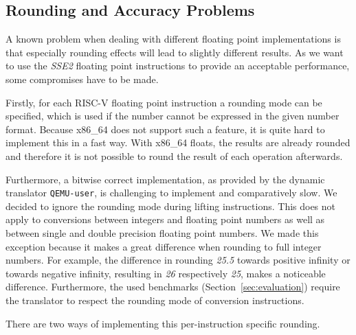 \documentclass[course=eragp]{aspdoc}
\begin{document}
\subsection{Rounding and Accuracy Problems}

A known problem when dealing with different floating point implementations is that especially
rounding effects will lead to slightly different results. As we want to use the \textit{SSE2} floating point
instructions to provide an acceptable performance, some compromises have to be made.

\par

Firstly, for each RISC-V floating point instruction a rounding mode can be specified, which is used
if the number cannot be expressed in the given number format. Because x86\_64 does not support such a
feature, it is quite hard to implement this in a fast way. With x86\_64 floats, the results are already rounded
and therefore it is not possible to round the result of each operation afterwards.

\par

Furthermore, a bitwise correct implementation, as provided by the dynamic translator
\texttt{QEMU-user}, is
challenging to implement and comparatively slow. We decided to ignore the rounding mode during lifting
instructions. This does not apply to conversions between integers and floating point numbers as well as between single
and double precision floating point numbers. We made this exception because it makes a great difference when
rounding to full integer numbers. For example, the difference in rounding \emph{25.5} towards positive infinity or
towards negative infinity, resulting in \emph{26} respectively \emph{25}, makes a noticeable difference.
Furthermore, the used benchmarks (Section~\ref{sec:evaluation}) require the translator to respect the rounding mode of
conversion instructions.

\par

There are two ways of implementing this per-instruction specific rounding.
\end{document}

